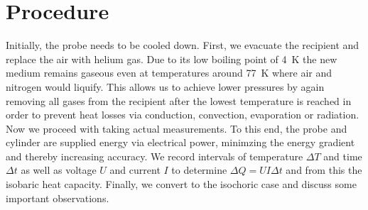 \section{Procedure}
\label{sec:procedure}

Initially, the probe needs to be cooled down. First, we evacuate the recipient and replace the air with
helium gas. Due to its low boiling point of \qty{4}{\kelvin} the new medium remains gaseous even
at temperatures around \qty{77}{\kelvin} where air and nitrogen would liquify. This allows us to
achieve lower pressures by again removing all gases from the recipient after the lowest temperature
is reached in order to prevent heat losses via conduction, convection, evaporation or radiation.
Now we proceed with taking actual measurements. To this end, the probe and cylinder are supplied
energy via electrical power, minimzing the energy gradient and thereby increasing accuracy.
We record intervals of temperature $\Delta T$ and time $\Delta t$ as well as voltage $U$ and
current $I$ to determine $\Delta Q = UI \Delta t$ and from this the isobaric heat capacity.
Finally, we convert to the isochoric case and discuss some important observations.
\enlargethispage{\baselineskip}\newpage
